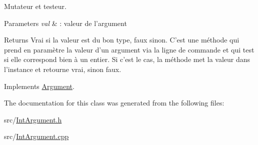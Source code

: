 Mutateur et testeur. 


\begin{DoxyParams}{Parameters}
{\em val} & \-: valeur de l'argument \\
\hline
\end{DoxyParams}
\begin{DoxyReturn}{Returns}
Vrai si la valeur est du bon type, faux sinon. C'est une méthode qui prend en paramètre la valeur d'un argument via la ligne de commande et qui test si elle correspond bien à un entier. Si c'est le cas, la méthode met la valeur dans l'instance et retourne vrai, sinon faux. 
\end{DoxyReturn}


Implements \hyperlink{classArgument_a20b6a0182f1402dd36b20b1a6743e665}{Argument}.



The documentation for this class was generated from the following files\-:\begin{DoxyCompactItemize}
\item 
src/\hyperlink{IntArgument_8h}{Int\-Argument.\-h}\item 
src/\hyperlink{IntArgument_8cpp}{Int\-Argument.\-cpp}\end{DoxyCompactItemize}
